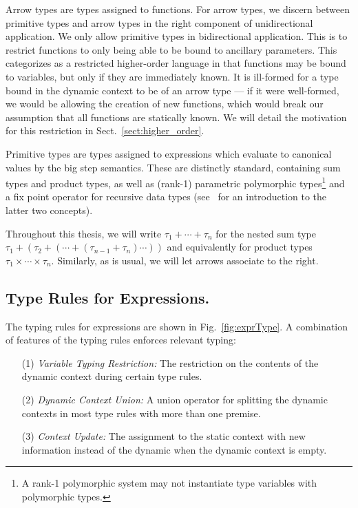 Arrow types are types assigned to functions. For arrow types, we discern
between primitive types and arrow types in the right component of
unidirectional application. We only allow primitive types in bidirectional
application. This is to restrict functions to only being able to be bound to
ancillary parameters. This categorizes \rfunc as a restricted higher-order
language in that functions may be bound to variables, but only if they are
immediately known. It is ill-formed for a type bound in the dynamic context to
be of an arrow type --- if it were well-formed, we would be allowing the
creation of new functions, which would break our assumption that all functions
are statically known. We will detail the motivation for this restriction in
Sect.~\ref{sect:higher_order}.

Primitive types are types assigned to expressions which evaluate to canonical
values by the big step semantics. These are distinctly standard, containing sum
types and product types, as well as (rank-1) parametric polymorphic
types\footnote{A rank-1 polymorphic system may not instantiate type variables
with polymorphic types.} and a fix point operator for recursive data types
(see~\cite{Pierce:2002:TPL} for an introduction to the latter two concepts).

Throughout this thesis, we will write $\tau_1 + \cdots + \tau_n$ for the nested
sum type $\tau_1 + (\tau_2 + (\cdots + (\tau_{n-1} + \tau_n) \cdots))$ and
equivalently for product types $\tau_1 \times \cdots \times \tau_n$. Similarly,
as is usual, we will let arrows associate to the right.

\subsection{Type Rules for Expressions.}

The typing rules for expressions are shown in Fig.~\ref{fig:exprType}. A
combination of features of the typing rules enforces relevant typing:

\begin{enumerate}

  \item [(1)] \emph{Variable Typing Restriction:} The restriction on the
    contents of the dynamic context during certain type rules.

  \item [(2)] \emph{Dynamic Context Union:} A union operator for splitting the
    dynamic contexts in most type rules with more than one premise.

  \item [(3)] \emph{Context Update:} The assignment to the static context with
    new information instead of the dynamic when the dynamic context is empty.

\end{enumerate}

